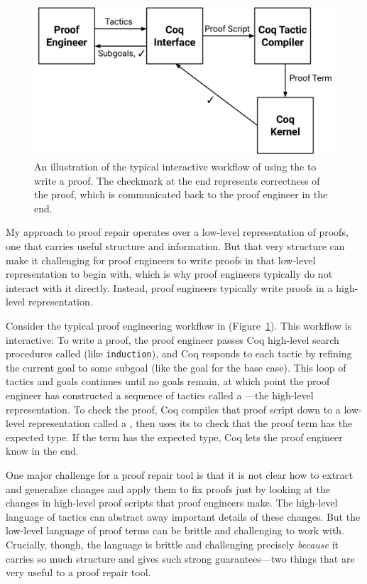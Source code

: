 \begin{figure}
\begin{center}
\includegraphics[scale=0.32]{Development}
\end{center}
\caption{An illustration of the typical interactive workflow of using the   to write a proof. The checkmark at the end
represents correctness of the proof, which is communicated back to the proof engineer in the end.}
\label{fig:workflow}
\end{figure}

My approach to proof repair operates over a low-level representation of proofs,
one that carries useful structure and information.
But that very structure can make it challenging for proof engineers to write proofs in that low-level representation
to begin with, which is why proof engineers typically do not interact with it directly.
Instead, proof engineers typically write proofs in a high-level representation.

Consider the typical proof engineering workflow in  (Figure~\ref{fig:workflow}).
This workflow is interactive:
To write a proof, the proof engineer passes Coq high-level search procedures called  (like \lstinline{induction}), and Coq responds to each tactic
by refining the current goal to some subgoal (like the goal for the base case). This loop of tactics and goals 
continues until no goals remain, at which point the proof engineer has constructed a sequence of tactics called a ---the
high-level representation.
To check the proof, Coq compiles that proof script down to a low-level representation called a ,
then uses its  to check that the proof term has the expected type.
If the term has the expected type, Coq lets the proof engineer know in the end.

One major challenge for a proof repair tool is that it is not clear how to extract and generalize changes and apply
them to fix proofs just by looking at the changes in high-level proof scripts that proof engineers make.
The high-level language of tactics can abstract away important details of these changes.
But the low-level language of proof terms can be brittle and challenging to work with.
Crucially, though, the language is brittle and challenging precisely \textit{because}
it carries so much structure and gives such strong guarantees---two things that are very useful to a proof repair tool.

